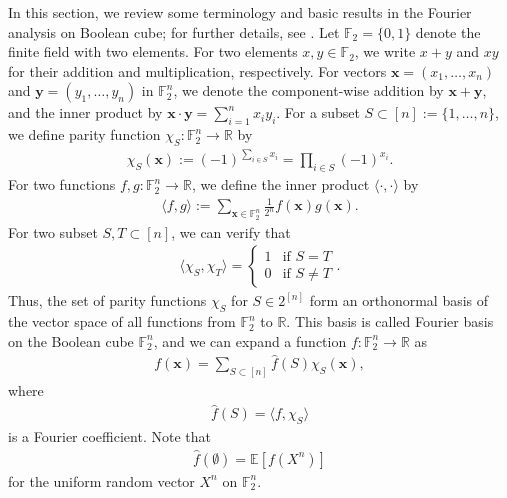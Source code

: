 \documentclass[journal,draftcls, onecolumn]{IEEEtran}
\begin{document}
In this section, we review some terminology and basic results in the Fourier analysis on Boolean cube; for further details, see \cite{ODonnell-book}.
Let $\mathbb{F}_2=\{0,1\}$ denote the finite field with two elements. For two elements $x,y \in \mathbb{F}_2$, we write 
$x+y$ and $xy$ for their addition and multiplication, respectively. For vectors $\bm{x}=(x_1,\ldots, x_n)$ and $\bm{y}=(y_1,\ldots,y_n)$
in $\mathbb{F}_2^n$, we denote the component-wise addition by $\bm{x}+\bm{y}$, and the inner product by $\bm{x}\cdot \bm{y}=\sum_{i=1}^n x_iy_i$.
For a subset $S \subset [n]:=\{1,\ldots,n\}$, we define parity function $\chi_S: \mathbb{F}_2^n \to \mathbb{R}$ by
\begin{align*}
\chi_S(\bm{x}) := (-1)^{\sum_{i\in S}x_i} = \prod_{i\in S} (-1)^{x_i}.
\end{align*}
For two functions $f,g:\mathbb{F}_2^n \to \mathbb{R}$, we define the inner product $\langle \cdot,\cdot\rangle$ by
\begin{align*}
\langle f,g\rangle := \sum_{\bm{x} \in \mathbb{F}_2^n} \frac{1}{2^n} f(\bm{x})g(\bm{x}).
\end{align*}
For two subset $S,T \subset [n]$, we can verify that
\begin{align} \label{eq:parity-orthogonality}
\langle \chi_S,\chi_T\rangle = \left\{
\begin{array}{ll}
1 & \mbox{if } S = T \\
0 & \mbox{if } S \neq T
\end{array}
\right..
\end{align}
Thus, the set of parity functions $\chi_S$ for $S \in 2^{[n]}$ form an orthonormal basis 
of the vector space of all functions from $\mathbb{F}_2^n$ to $\mathbb{R}$.
This basis is called Fourier basis on the Boolean cube $\mathbb{F}_2^n$, and we can expand a function $f:\mathbb{F}_2^n\to \mathbb{R}$ as
\begin{align*}
f(\bm{x}) = \sum_{S \subset [n]} \widehat{f}(S) \chi_S(\bm{x}),
\end{align*}
where 
\begin{align*}
\widehat{f}(S) = \langle f, \chi_S \rangle
\end{align*}
is a Fourier coefficient. Note that 
\begin{align} \label{eq:fourier-coefficient-empty}
\widehat{f}(\emptyset) = \mathbb{E}[f(X^n)]
\end{align}
for the uniform random vector $X^n$ on $\mathbb{F}_2^n$.
\end{document}
